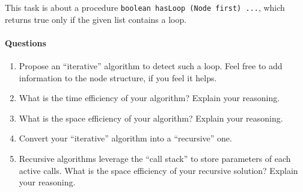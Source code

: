 \documentclass{article}
\begin{document}
This task is about a procedure \texttt{boolean hasLoop (Node
  first) {...}}, which returns true only if the given list contains a
loop.

\paragraph{Questions}

\begin{enumerate}
\item Propose an ``iterative'' algorithm to detect such a loop. Feel
  free to add information to the node structure, if you feel it helps.
\item What is the time efficiency of your algorithm? Explain your reasoning.
\item What is the space efficiency of your algorithm? Explain your reasoning.
\item Convert your ``iterative'' algorithm into a ``recursive'' one.
\item Recursive algorithms leverage the ``call stack'' to store
  parameters of each active calls. What is the space efficiency of
  your recursive solution?  Explain your reasoning.
\end{enumerate}
\end{document}

